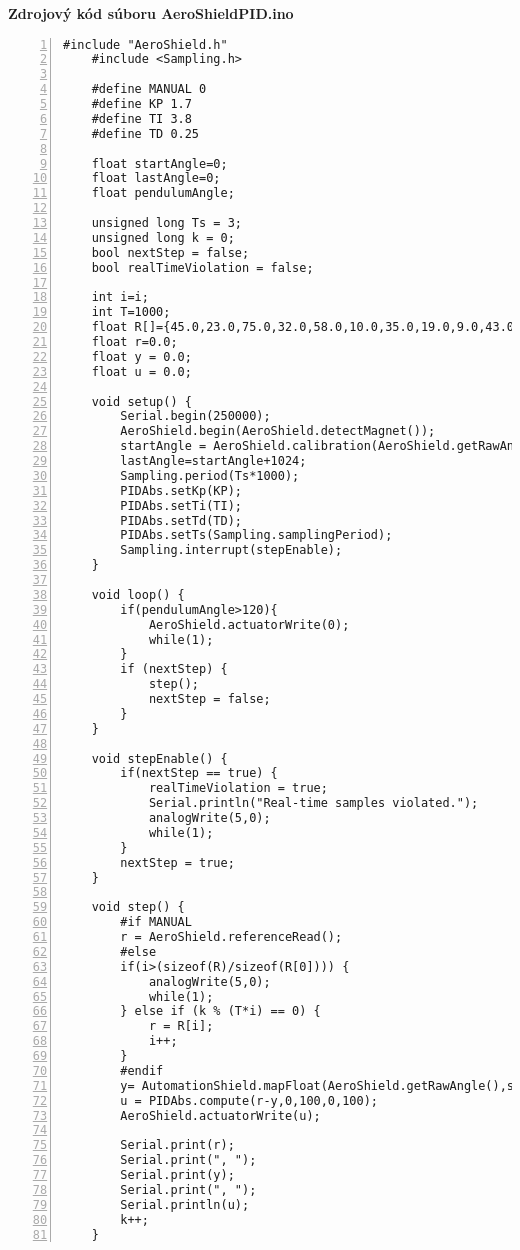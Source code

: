 \LARGE\bf{Zdrojový kód súboru AeroShieldPID.ino}
\label{AeroShieldPID.ino}
\vspace{1cm}
\begin{lstlisting}[numbers=left,basicstyle=\scriptsize,caption={Zdrojový kód súboru AeroShieldPID.ino.},captionpos=b]	
	#include "AeroShield.h"              
	#include <Sampling.h>   
	
	#define MANUAL 0    
	#define KP 1.7  
	#define TI 3.8  
	#define TD 0.25   
	
	float startAngle=0; 
	float lastAngle=0; 
	float pendulumAngle;
	
	unsigned long Ts = 3; 
	unsigned long k = 0; 
	bool nextStep = false;  
	bool realTimeViolation = false;
	
	int i=i;          
	int T=1000;           
	float R[]={45.0,23.0,75.0,32.0,58.0,10.0,35.0,19.0,9.0,43.0,23.0,65.0,15.0,80.0}; 
	float r=0.0;          
	float y = 0.0;        
	float u = 0.0;         
	
	void setup() {           
		Serial.begin(250000);                         
		AeroShield.begin(AeroShield.detectMagnet());
		startAngle = AeroShield.calibration(AeroShield.getRawAngle()); 
		lastAngle=startAngle+1024;                                  
		Sampling.period(Ts*1000);      
		PIDAbs.setKp(KP);       
		PIDAbs.setTi(TI);    
		PIDAbs.setTd(TD);     
		PIDAbs.setTs(Sampling.samplingPeriod); 
		Sampling.interrupt(stepEnable); 
	}
	
	void loop() {
		if(pendulumAngle>120){
			AeroShield.actuatorWrite(0);
			while(1);
		} 
		if (nextStep) {    
			step();          
			nextStep = false;  
		}
	}
	
	void stepEnable() {             
		if(nextStep == true) {         
			realTimeViolation = true;   
			Serial.println("Real-time samples violated."); 
			analogWrite(5,0);  
			while(1);    
		}
		nextStep = true; 
	}
	
	void step() {  
		#if MANUAL                       
		r = AeroShield.referenceRead(); 
		#else        
		if(i>(sizeof(R)/sizeof(R[0]))) {  
			analogWrite(5,0); 
			while(1); 
		} else if (k % (T*i) == 0) {
			r = R[i];
			i++; 
		}
		#endif
		y= AutomationShield.mapFloat(AeroShield.getRawAngle(),startAngle,lastAngle,0.00,100.00);
		u = PIDAbs.compute(r-y,0,100,0,100);
		AeroShield.actuatorWrite(u);
		
		Serial.print(r);
		Serial.print(", ");
		Serial.print(y); 
		Serial.print(", ");
		Serial.println(u); 
		k++; 
	}
\end{lstlisting}